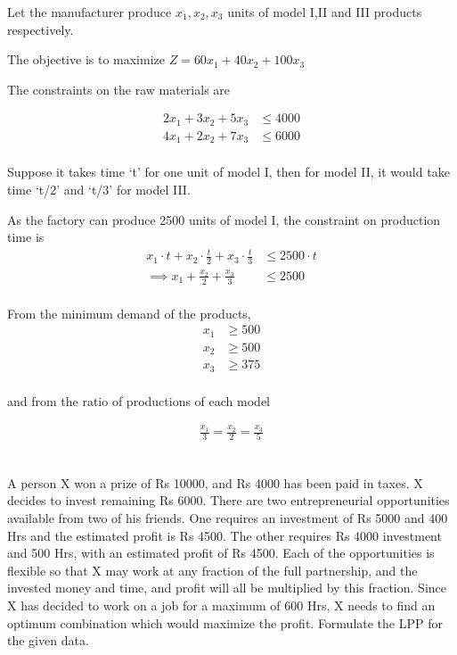 \documentclass[12pt]{article}
\begin{document}
Let the manufacturer produce $x_1,x_2,x_3$ units of model I,II and III products respectively.

The objective is to maximize $Z=60x_1+40x_2+100x_3$

The constraints on the raw materials are 

\begin{align*}
2x_1+3x_2+5x_3 & \le 4000 \tag{raw material A} \\
4x_1+2x_2+7x_3 & \le 6000 \tag{raw material B} \\
\end{align*}

Suppose it takes time `t' for one unit of model I, then for model II, it would take time `t/2' and `t/3' for model III.

As the factory can produce 2500 units of model I, the constraint on production time is 
\begin{align*}
x_1\cdot t+x_2\cdot \frac{t}{2}+x_3\cdot \frac{t}{3}&\le 2500 \cdot t  \\
\implies x_1+\frac{x_2}{2}+\frac{x_3}{3}&\le 2500  \\
\end{align*}

From the minimum demand of the products,
\begin{align*}
x_1 & \ge 500 \\
x_2 & \ge 500 \\
x_3 & \ge 375 \\
\end{align*}

and from the ratio of productions of each model

\begin{align*}
\frac{x_1}{3}=\frac{x_2}{2}=\frac{x_3}{5}  \\
\end{align*}
\subsection{}

A person X won a prize of Rs 10000, and Rs 4000 has been paid in taxes. X decides to invest remaining Rs 6000. There are two entrepreneurial opportunities available from two of his friends. One requires an investment of Rs 5000 and 400 Hrs and the estimated profit is Rs 4500. The other requires Rs 4000 investment and 500 Hrs, with an estimated profit of Rs 4500. Each of the opportunities is flexible so that X may work at any fraction of the full partnership, and the invested money and time, and profit will all be multiplied by this fraction. Since X has decided to work on a job for a maximum of 600 Hrs, X needs to find an optimum combination which would maximize the profit. Formulate the LPP for the given data.
\end{document}

